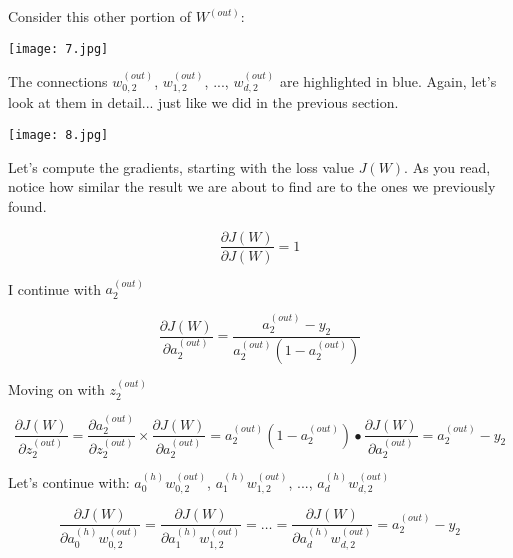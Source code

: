 \documentclass[../main.tex]{subfiles}
\begin{document}
Consider this other portion of $W^{(out)}$:

\begin{center}
    \texttt{[image: 7.jpg]}
\end{center}

\vspace{5mm} %

The connections $w_{0,2}^{(out)}$, $w_{1,2}^{(out)}$, ..., $w_{d,2}^{(out)}$
are highlighted in blue. Again, let's look at them in detail... just
like we did in the previous section.

\vspace{5mm} %

\begin{center}
    \texttt{[image: 8.jpg]}
\end{center}

\vspace{5mm} %

Let's compute the gradients, starting with the loss value $J(W)$.
As you read, notice how similar the result we are about to find are to the
ones we previously found.

\[\frac{\partial J(W)}{\partial J(W)} = 1 \]

\vspace{5mm} %

I continue with $a_{2}^{(out)}$

\[
    \frac{\partial J(W)}{\partial a_{2}^{(out)}} =
    \frac{a_{2}^{(out)} - y_{2}}{a_{2}^{(out)}(1 - a_{2}^{(out)})}
\]

\vspace{5mm} %

Moving on with $z_{2}^{(out)}$

\[
    \frac{\partial J(W)}{\partial z_{2}^{(out)}} =
    \frac{\partial a_{2}^{(out)}}{\partial z_{2}^{(out)}} \times
    \frac{\partial J(W)}{\partial a_{2}^{(out)}} =
    a_{2}^{(out)}(1 - a_{2}^{(out)}) \bullet \frac{\partial J(W)}{\partial a_{2}^{(out)}} =
    a_{2}^{(out)} - y_2
\]

\vspace{5mm} %

Let's continue with: $a_0^{(h)}w_{0,2}^{(out)}$, $a_1^{(h)}w_{1,2}^{(out)}$, ..., $a_d^{(h)}w_{d,2}^{(out)}$


\[
    \frac{\partial J(W)}{\partial a_0^{(h)}w_{0,2}^{(out)}} =
    \frac{\partial J(W)}{\partial a_1^{(h)}w_{1,2}^{(out)}} =
    \dots =
    \frac{\partial J(W)}{\partial a_d^{(h)}w_{d,2}^{(out)}} = 
    a_{2}^{(out)} - y_2
\]
\end{document}
